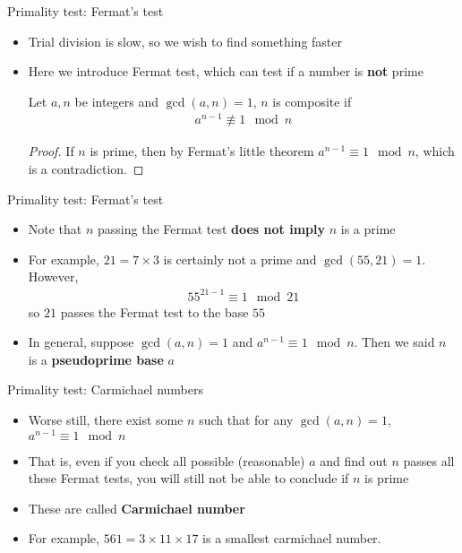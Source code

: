 \documentclass[10pt,xcolor={table,dvipsnames},t]{beamer}
\begin{document}
\begin{frame}{Primality test: Fermat's test}
  \begin{itemize}
    \item Trial division is slow, so we wish to find something faster 
    \item Here we introduce Fermat test, which can test if a number is \textbf{not} prime 
    \begin{theorem}
      Let $a,n$ be integers and $\gcd(a,n)=1$, $n$ is composite if 
      \begin{align*}
        a^{n-1} \not\equiv 1 \mod n
      \end{align*} 
      \begin{proof}
        If $n$ is prime, then by Fermat's little theorem $a^{n-1} \equiv 1 \mod n$, which is a contradiction.
      \end{proof}
    \end{theorem}
  \end{itemize}
\end{frame}

\begin{frame}{Primality test: Fermat's test}
  \begin{itemize}
    \item Note that $n$ passing the Fermat test \textbf{does not imply} $n$ is a prime 
    \item For example, $21 = 7\times 3$ is certainly not a prime and $\gcd(55,21)=1$. However,
    \begin{align*}
      55^{21-1} \equiv 1 \mod 21
    \end{align*}
    so $21$ passes the Fermat test to the base $55$
    \item In general, suppose $\gcd(a,n)=1$ and $a^{n-1}\equiv 1 \mod n$. Then we said $n$ is a \textbf{pseudoprime base} $a$ 
  \end{itemize}
\end{frame}

\begin{frame}{Primality test: Carmichael numbers}
  \begin{itemize}
    \item Worse still, there exist some $n$ such that for any $\gcd(a,n)=1$, $a^{n-1} \equiv 1 \mod n$
    \item That is, even if you check all possible (reasonable) $a$ and find out $n$ passes all these Fermat tests, you will still not be able to conclude if $n$ is prime
    \item These are called \textbf{Carmichael number}
    \item For example, $561 = 3\times 11\times 17$ is a smallest carmichael number.
  \end{itemize}
\end{frame}
\end{document}

